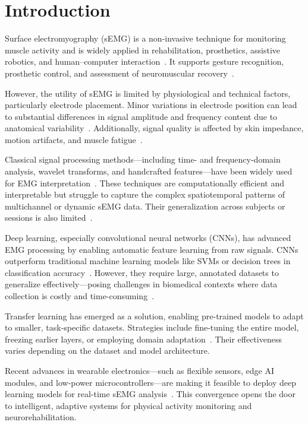 %
%

\section*{Introduction}

Surface electromyography (sEMG) is a non-invasive technique for monitoring muscle activity and is widely applied in rehabilitation, prosthetics, assistive robotics, and human–computer interaction~\cite{Zhou2023}. It supports gesture recognition, prosthetic control, and assessment of neuromuscular recovery~\cite{Xie2024}.

However, the utility of sEMG is limited by physiological and technical factors, particularly electrode placement. Minor variations in electrode position can lead to substantial differences in signal amplitude and frequency content due to anatomical variability~\cite{Merletti2020}. Additionally, signal quality is affected by skin impedance, motion artifacts, and muscle fatigue~\cite{Plux2022}.

Classical signal processing methods—including time- and frequency-domain analysis, wavelet transforms, and handcrafted features—have been widely used for EMG interpretation~\cite{Chowdhury2013}. These techniques are computationally efficient and interpretable but struggle to capture the complex spatiotemporal patterns of multichannel or dynamic sEMG data. Their generalization across subjects or sessions is also limited~\cite{Phinyomark2019}.

Deep learning, especially convolutional neural networks (CNNs), has advanced EMG processing by enabling automatic feature learning from raw signals. CNNs outperform traditional machine learning models like SVMs or decision trees in classification accuracy~\cite{Faust2018}. However, they require large, annotated datasets to generalize effectively—posing challenges in biomedical contexts where data collection is costly and time-consuming~\cite{Wu2022}.

Transfer learning has emerged as a solution, enabling pre-trained models to adapt to smaller, task-specific datasets. Strategies include fine-tuning the entire model, freezing earlier layers, or employing domain adaptation~\cite{Cote2019, Ameri2020}. Their effectiveness varies depending on the dataset and model architecture.

Recent advances in wearable electronics—such as flexible sensors, edge AI modules, and low-power microcontrollers—are making it feasible to deploy deep learning models for real-time sEMG analysis~\cite{Shen2020}. This convergence opens the door to intelligent, adaptive systems for physical activity monitoring and neurorehabilitation.

